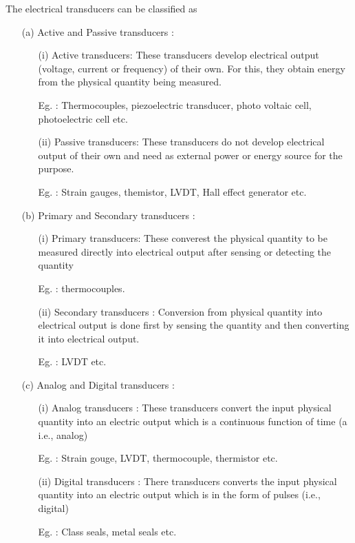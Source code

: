 The electrical transducers can be classified as 
\begin{enumerate}
\item[(a)] Active and Passive transducers :
\begin{itemize}
\item[(i)] Active transducers: These transducers develop electrical
  output (voltage, current or frequency) of their own. For this, they
  obtain energy from the physical quantity being measured.

Eg. : Thermocouples, piezoelectric transducer, photo voltaic cell,
photoelectric cell etc.
 
\item[(ii)] Passive transducers: These transducers do not develop
  electrical output of their own and need as external power or energy
  source for the purpose.

Eg. : Strain gauges, themistor, LVDT, Hall effect generator etc.
\end{itemize}

\item[(b)] Primary and Secondary transducers :
\begin{itemize}
\item[(i)] Primary transducers: These converest the physical quantity
  to be measured directly into electrical output after sensing or
  detecting the quantity 

Eg. : thermocouples.  

\item[(ii)] Secondary transducers : Conversion from physical quantity
  into electrical output is done first by sensing the quantity and
  then converting it into electrical output.

Eg. : LVDT etc.
\end{itemize}

\item[(c)] Analog and Digital transducers :
\begin{itemize}
\item[(i)] Analog transducers : These transducers convert the input
  physical quantity into an electric output which is a continuous
  function of time (a i.e., analog)

Eg. : Strain gouge, LVDT, thermocouple, thermistor etc.

\item[(ii)] Digital transducers : There transducers converts the input
  physical quantity into an electric output which is in the form of
  pulses (i.e., digital)

Eg. : Class seals, metal seals etc.
\end{itemize}
\end{enumerate}

